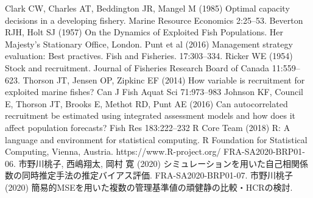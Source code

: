 \documentclass[11pt]{jsarticle}
\begin{document}
\begin{thebibliography}{9}
   Clark CW, Charles AT, Beddington JR, Mangel M (1985) Optimal capacity decisions in a developing fishery. Marine Resource Economics 2:25--53.
   Beverton RJH, Holt SJ (1957) On the Dynamics of Exploited Fish Populations. Her Majesty’s Stationary Office, London.
   Punt et al (2016) Management strategy evaluation: Best practives. Fish and Fisheries. 17:303--334.
 Ricker WE (1954) Stock and recruitment. Journal of Fisheries Research Board of Canada 11:559--623.
 Thorson JT, Jensen OP, Zipkinc EF (2014) How variable is recruitment for exploited marine fishes? Can J Fish Aquat Sci 71:973--983
 Johnson KF, Council E, Thorson JT, Brooks E, Methot RD, Punt AE (2016) Can autocorrelated recruitment be estimated using integrated assessment models and how does it affect population forecasts? Fish Res 183:222--232
 R Core Team (2018) R: A language and environment for statistical computing. R Foundation for Statistical Computing, Vienna, Austria. https://www.R-project.org/
 FRA-SA2020-BRP01-06. 市野川桃子, 西嶋翔太, 岡村 寛 (2020) シミュレーションを用いた自己相関係数の同時推定手法の推定バイアス評価.
 FRA-SA2020-BRP01-07. 市野川桃子 (2020) 簡易的MSEを用いた複数の管理基準値の頑健静の比較・HCRの検討.
  

\end{thebibliography}
\end{document}
